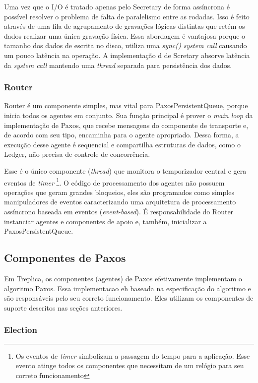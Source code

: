 Uma vez que o I/O é tratado apenas pelo Secretary de forma assíncrona é possível resolver
o problema de falta de paralelismo entre as rodadas. Isso é feito através de uma fila de
agrupamento de gravações lógicas distintas que retém os dados realizar uma única gravação
física. Essa abordagem é vantajosa porque o tamanho dos dados de escrita no disco, utiliza
uma \emph{sync() system call} causando um pouco latência na operação. A implementação d
de Scretary absorve latência da \emph{system call} mantendo uma \emph{thread} separada
para persistência dos dados.

\subsubsection{Router}

Router é um componente simples, mas vital para PaxosPersistentQueue, porque inicia todos
os agentes em conjunto. Sua função principal é prover o \emph{main loop} da implementação
de Paxos, que recebe mensagens do componente de transporte e, de acordo com seu tipo,
encaminha para o agente apropriado. Dessa forma, a execução desse agente é sequencial e
compartilha estruturas de dados, como o Ledger, não precisa de controle de concorrência.

Esse é o único componente (\emph{thread}) que monitora o temporizador central e gera
eventos de \emph{timer} \footnote{Os eventos de \emph{timer} simbolizam a passagem do
tempo para a aplicação. Esse evento atinge todos os componentes que necessitam de um
relógio para seu correto funcionamento}. O código de processamento dos agentes não possuem
operações que geram grandes bloqueios, eles são programados como simples manipuladores de
eventos caracterizando uma arquitetura de processamento assíncrono baseada em eventos
(\emph{event-based}). É responsabilidade do Router instanciar agentes e componentes de
apoio e, também, inicializar a PaxosPersistentQueue.

\subsection{Componentes de Paxos}\label{sec:componentes_paxos}

Em Treplica, os componentes (agentes) de Paxos efetivamente implementam o algoritmo Paxos.
Essa implementacao eh baseada na especificação do algoritmo e são responsáveis pelo seu
correto funcionamento. Eles utilizam os componentes de suporte descritos nas seções
anteriores.

\subsubsection{Election}

